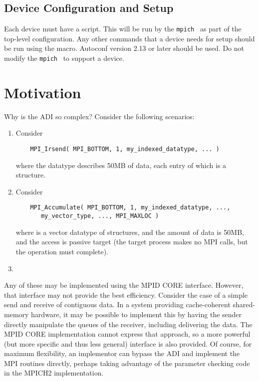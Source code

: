 \documentclass{article}
\newcommand{\mpich}{\texttt{mpich}}
\begin{document}
\subsection{Device Configuration and Setup}
\label{sec:adi3-setup}
Each device must have a  script.  This will be run by
the \mpich\  as part of the top-level configuration.
Any other commands that a device needs for setup should be run using
the   macro.  Autoconf version
2.13 or later should be used.  Do not modify the \mpich\
 to support a device.

\section{Motivation}
\label{sec:motivation}

Why is the ADI so complex?  Consider the following scenarios:
\begin{enumerate}
\item Consider
\begin{verbatim}
    MPI_Irsend( MPI_BOTTOM, 1, my_indexed_datatype, ... )
\end{verbatim}
where the datatype describes 50MB of data, each entry of which is a
structure.
\item Consider
\begin{verbatim}
    MPI_Accumulate( MPI_BOTTOM, 1, my_indexed_datatype, ..., 
       my_vector_type, ..., MPI_MAXLOC )
\end{verbatim}
where  is
a vector datatype of structures, and the amount of data is 50MB, and
the access is passive target (the target process makes no MPI calls,
but the operation must complete).
\item 
\end{enumerate}

Any of these may be implemented using the MPID CORE interface.
However, that interface may not provide the best efficiency.  Consider
the case of a simple send and receive of contiguous data.  In a system
providing cache-coherent shared-memory hardware, it may be possible to
implement this by having the sender directly manipulate the queues of
the receiver, including delivering the data.  The MPID CORE
implementation cannot express that approach, so a more powerful (but
more specific and thus less general) interface is also provided.  Of
course, for maximum flexibility, an implementor can bypass the ADI and
implement the MPI routines directly, perhaps taking advantage of the
parameter checking code in the MPICH2 implementation.
\end{document}
